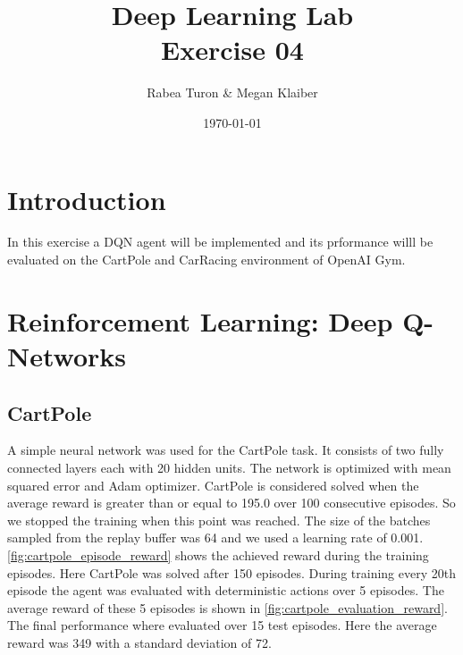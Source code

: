 \documentclass[a4paper,12pt]{article}
\begin{document}
\title{Deep Learning Lab \\ Exercise 04 }
\author{Rabea Turon \& Megan Klaiber}
\date{\today}
\maketitle

\section{Introduction}

In this exercise a DQN agent will be implemented and its prformance willl be evaluated on the CartPole and CarRacing environment of OpenAI Gym.


\section{Reinforcement Learning: Deep Q-Networks}\label{rl}


\subsection{CartPole}\label{cartpole}

A simple neural network was used for the CartPole task. It consists of two fully connected layers each with 20 hidden units. The network is optimized with mean squared error and Adam optimizer. CartPole is considered solved when the average reward is greater than or equal to 195.0 over 100 consecutive episodes. So we stopped the training when this point was reached. The size of the batches sampled from the replay buffer was 64 and we used a learning rate of 0.001.\\

\autoref{fig:cartpole_episode_reward} shows the achieved reward during the training episodes. Here CartPole was solved after 150 episodes. During training every 20th episode the agent was evaluated with deterministic actions over 5 episodes. The average reward of these 5 episodes is shown in \autoref{fig:cartpole_evaluation_reward}. The final performance where evaluated over 15 test episodes. Here the average reward was 349 with a standard deviation of 72.
\end{document}
